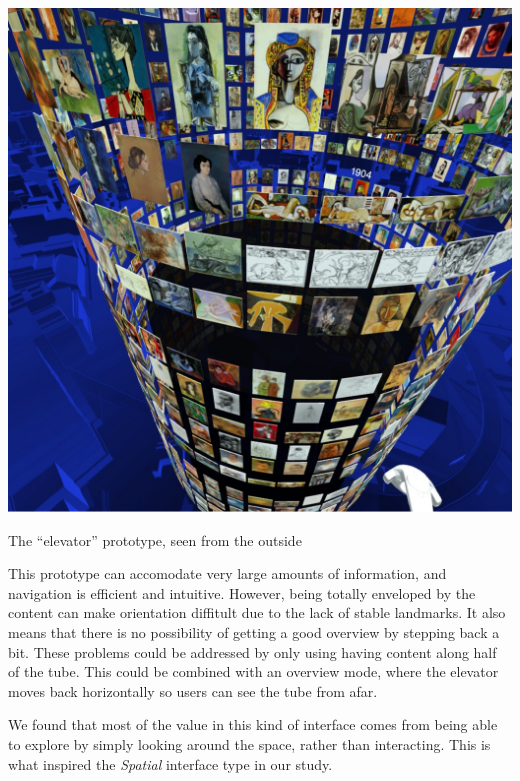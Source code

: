 \documentclass[nobib]{tufte-book} %
\begin{document}
\begin{marginfigure}
  \includegraphics[width=\linewidth]{picassooutside.jpg}
  \caption{The ``elevator'' prototype, seen from the outside}
  \label{fig:picassooutside}
\end{marginfigure}

This prototype can accomodate very large amounts of information, and navigation is efficient and intuitive. However, being totally enveloped by the content can make orientation diffitult due to the lack of stable landmarks. It also means that there is no possibility of getting a good overview by stepping back a bit. These problems could be addressed by only using having content along half of the tube. This could be combined with an overview mode, where the elevator moves back horizontally so users can see the tube from afar.

We found that most of the value in this kind of interface comes from being able to explore by simply looking around the space, rather than interacting. This is what inspired the \emph{Spatial} interface type in our study.
\end{document}
